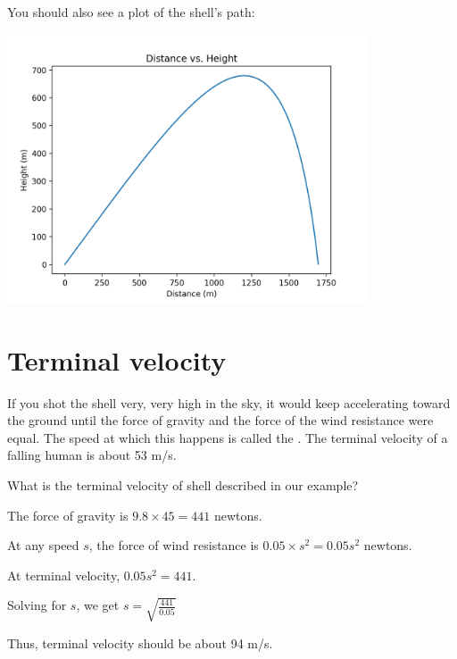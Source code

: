 You should also see a plot of the shell's path:

\includegraphics[width=0.8\textwidth]{artillery.png}

\section{Terminal velocity}

If you shot the shell very, very high in the sky, it would keep accelerating 
toward the ground until the force of gravity and the force of the wind resistance were equal.
The speed at which this happens is called the .  The terminal velocity of a
falling human is about 53 m/s.

\begin{Exercise}[title={Terminal velocity}, label=terminal_velocity]
    What is the terminal velocity of shell described in our example?
\end{Exercise}
\begin{Answer}[ref=terminal_velocity]
The force of gravity is $9.8 \times 45 = 441$ newtons.

At any speed $s$, the force of wind resistance is $0.05 \times s^2 = 0.05 s^2$ newtons.

At terminal velocity, $0.05 s^2 = 441$. 

Solving for $s$, we get $s = \sqrt{\frac{441}{0.05}}$

Thus, terminal velocity should be about 94 m/s.

\end{Answer}
